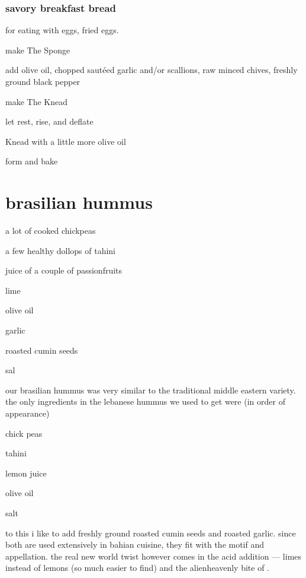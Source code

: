\subsubsection{savory breakfast bread}

for eating with eggs, fried eggs.

\begin{algorithm}
  \item make The Sponge
  \item add olive oil, chopped saut\'{e}ed garlic and/or scallions, raw minced chives, freshly ground black pepper 
  \item make The Knead
  \item let rest, rise, and deflate
  \item Knead with a little more olive oil
  \item form and bake
\end{algorithm}

\section{brasilian \gls{hummus}}

\begin{ingredients}
  \item a lot of cooked chickpeas
  \item a few healthy dollops of \gls{tahini}
  \item juice of a couple of passionfruits
  \item lime
  \item olive oil
  \item garlic
  \item roasted cumin seeds
  \item sal
\end{ingredients}

our brasilian hummus was very similar to the traditional middle
eastern variety. the only ingredients in the lebanese hummus we used
to get were (in order of appearance)

\begin{ingredients}
  \item chick peas
  \item tahini
  \item lemon juice
  \item olive oil
  \item salt
\end{ingredients}

to this i like to add freshly ground roasted cumin seeds and roasted
garlic. since both are used extensively in bahian cuisine, they fit
with the motif and appellation. the real new world twist however comes
in the acid addition --- limes instead of lemons (so much easier to
find) and the alienheavenly bite of .

